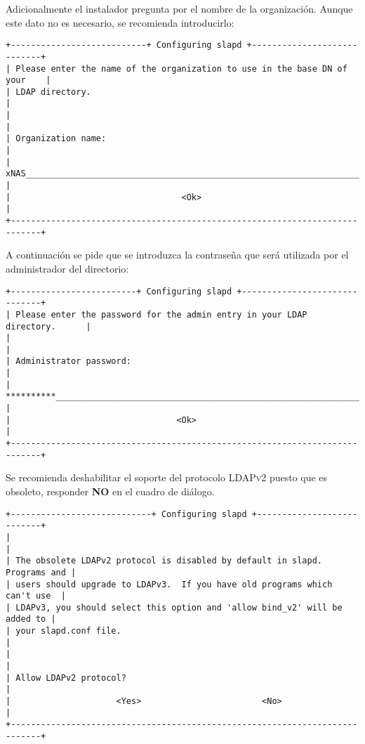 Adicionalmente el instalador pregunta por el nombre de la organizaci\'{o}n. Aunque este dato no es necesario, se recomienda introducirlo:

{
\scriptsize
\linespread{1}
\begin{verbatim}
+---------------------------+ Configuring slapd +----------------------------+
| Please enter the name of the organization to use in the base DN of your    |
| LDAP directory.                                                            |
|                                                                            |
| Organization name:                                                         |
| xNAS______________________________________________________________________ |
|                                  <Ok>                                      |
+----------------------------------------------------------------------------+
\end{verbatim}
}

A continuaci\'{o}n se pide que se introduzca la contrase\~{n}a que ser\'{a} utilizada por el administrador del directorio:

{
\scriptsize
\linespread{1}
\begin{verbatim}
+-------------------------+ Configuring slapd +------------------------------+
| Please enter the password for the admin entry in your LDAP directory.      |
|                                                                            |
| Administrator password:                                                    |
| **********________________________________________________________________ |
|                                 <Ok>                                       |
+----------------------------------------------------------------------------+
\end{verbatim}
}

Se recomienda deshabilitar el soporte del protocolo \textsc{LDAPv2} puesto que es obsoleto, responder \textbf{NO} en el cuadro de di\'{a}logo.

{
\scriptsize
\linespread{1}
\begin{verbatim}
+----------------------------+ Configuring slapd +---------------------------+
|                                                                            |
| The obsolete LDAPv2 protocol is disabled by default in slapd. Programs and |
| users should upgrade to LDAPv3.  If you have old programs which can't use  |
| LDAPv3, you should select this option and 'allow bind_v2' will be added to |
| your slapd.conf file.                                                      |
|                                                                            |
| Allow LDAPv2 protocol?                                                     |
|                     <Yes>                        <No>                      |
+----------------------------------------------------------------------------+
\end{verbatim}
}

